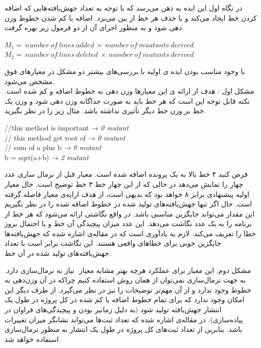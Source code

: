 در نگاه اول  این ایده به ذهن می‌رسد که با توجه به تعداد جهش‌یافته‌هایی که  اضافه   کردن  خط ایجاد می‌کند و یا حذف هر خط  از بین می‌برد. اضافه یا کم شدن خطوط وزن دهی شود و به منظور اجرای آن از دو  فرمول زیر بهره گرفت.\\
\begin{latin}
	
	$M_1 =\ number\ of\ lines\ added\ \times \ number\ of\ muatants\ derived$\\
	
	$M_2 =\ number\ of\ lines\ deleted\ \times \ number\ of\ mutants\ derived$\\
\end{latin}


با وجود مناسب بودن ایده ی اولیه با بررسی‌های بیشتر دو مشکل در معیارهای فوق مشخص می‌شود.\\
مشکل اول : هدف از ارائه ی این معیارها وزن دهی به خطوط اضافه و کم شده است. نکته قابل توجه این است که هر خط باید به صورت جداگانه وزن دهی شود و وزن یک خط بر وزن خط دیگر تأثیری نداشته باشد. مثال زیر را در نظر بگیرید.
\begin{latin}
\flushleft
//this method is important  \emph{→ 0 mutant} \\
// this method get root of \emph{→ 0 mutant}\\
// sum of a plus b \emph{→ 0 mutant} \\ 
b = sqrt(a+b) \emph{→ 2 mutant} \\
\end{latin}

فرض کنید ۴ خط بالا به یک پرونده اضافه شده است. معیار   قبل از نرمال سازی عدد چهار را نمایش می‌دهد در حالی که از این چهار خط ۳ خط توضیح است. حال معیار اولیه پیشنهادی برابر ۸ خواهد بود که بدیهی است، از هدف ارايه‌ی معیار فاصله گرفته است. حال اگر تنها جهش‌یافته‌های تولید شده در خطوط اضافه شده را در نظر بگیریم این مقدار می‌تواند جایگزین مناسبی باشد. در‌ واقع نگاشتی  ارائه می‌شود که هر خط از برنامه را به یک عدد نگاشت می‌دهد. این عدد میزان پیچیدگی آن خط و یا احتمال بروز خطا را تعریف می‌کند.  لازم به یادآوری است که در مقاله‌ی  \cite{just2014mutants} اشاره شده که جهش‌یافته‌ها جایگزین خوبی برای خطاهای واقعی هستند. این نگاشت برابر است با تعداد جهش‌یافته‌های تولید شده در آن خط.

مشکل دوم: این معیار برای عملکرد هرچه بهتر مشابه معیار  ‌ نیاز به نرمال‌سازی دارد. به جهت نرمال‌سازی نمی‌توان از همان روش استفاده کنیم چراکه در آن وزن‌دهی به خطوط وجود ندارد و از آن مهم‌تر توضیحات را نیز در نظر می‌گیرد. از طرف دیگر این امکان وجود ندارد که برای تمام خطوط اضافه یا کم شده در کل پروژه در طول یک انتشار جهش‌یافته تولید شود (به دلیل زمانبر بودن و پیچیدگی‌های فراوان در پیاده‌سازی). در مقاله‌ی \cite{bird2011don} اشاره شده که تعداد ثبت‌ها می‌تواند نشانگر میزان تغییرات باشد. بنابرین از تعداد ثبت‌های کل پروژه در طول یک انتشار به منظور نرمال‌سازی استفاده خواهد شد.\\

